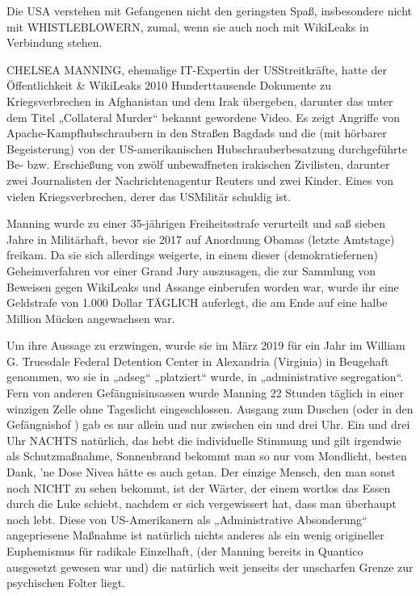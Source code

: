 \begin{multicols}{2}
Die USA verstehen mit Gefangenen nicht den geringsten
Spaß, insbesondere nicht mit WHISTLEBLOWERN, zumal, wenn sie auch noch mit WikiLeaks in Verbindung
stehen.

CHELSEA MANNING, ehemalige IT-Expertin der USStreitkräfte, hatte der Öffentlichkeit \& WikiLeaks 2010
Hunderttausende Dokumente zu Kriegsverbrechen in
Afghanistan und dem Irak übergeben, darunter das unter dem Titel „Collateral Murder“ bekannt gewordene Video. Es zeigt Angriffe von Apache-Kampfhubschraubern
in den Straßen Bagdads und die (mit hörbarer Begeisterung) von der US-amerikanischen Hubschrauberbesatzung durchgeführte Be- bzw. Erschießung von zwölf
unbewaffneten irakischen Zivilisten, darunter zwei Journalisten der Nachrichtenagentur Reuters und zwei Kinder. Eines von vielen Kriegsverbrechen, derer das USMilitär schuldig ist.

Manning wurde zu einer 35-jährigen Freiheitsstrafe verurteilt und saß sieben Jahre in Militärhaft, bevor sie 2017
auf Anordnung Obamas (letzte Amtstage) freikam. Da
sie sich allerdings weigerte, in einem dieser (demokratiefernen) Geheimverfahren vor einer Grand Jury auszusagen, die zur Sammlung von Beweisen gegen WikiLeaks und Assange einberufen worden war, wurde ihr eine Geldstrafe von 1.000 Dollar TÄGLICH auferlegt, die am
Ende auf eine halbe Million Mücken angewachsen war.

Um ihre Aussage zu erzwingen, wurde sie im März 2019
für ein Jahr im William G. Truesdale Federal Detention
Center in Alexandria (Virginia) in Beugehaft genommen,
wo sie in „adseg“ „platziert“ wurde, in „administrative segregation“. Fern von anderen Gefängnisinsassen wurde
Manning 22 Stunden täglich in einer winzigen Zelle ohne
Tageslicht eingeschlossen. Ausgang zum Duschen (oder
in den Gefängnishof ) gab es nur allein und nur zwischen
ein und drei Uhr. Ein und drei Uhr NACHTS natürlich,
das hebt die individuelle Stimmung und gilt irgendwie
als Schutzmaßnahme, Sonnenbrand bekommt man so
nur vom Mondlicht, besten Dank, ’ne Dose Nivea hätte
es auch getan. Der einzige Mensch, den man sonst noch
NICHT zu sehen bekommt, ist der Wärter, der einem
wortlos das Essen durch die Luke schiebt, nachdem er
sich vergewissert hat, dass man überhaupt noch lebt.
Diese von US-Amerikanern als „Administrative Absonderung“ angepriesene Maßnahme ist natürlich nichts
anderes als ein wenig origineller Euphemismus für radikale Einzelhaft, (der Manning bereits in Quantico ausgesetzt gewesen war und) die natürlich weit jenseits der
unscharfen Grenze zur psychischen Folter liegt.


\end{multicols}

